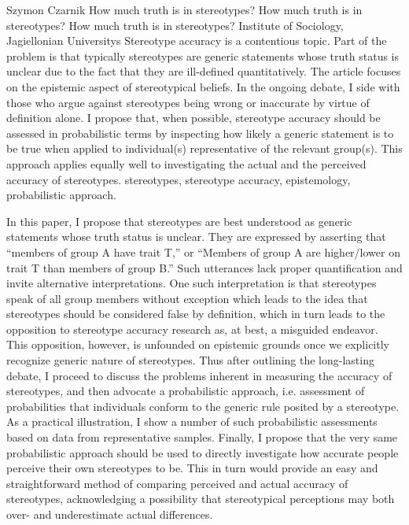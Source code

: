 \begin{artengenv}{Szymon Czarnik}
	{How much truth is in stereotypes?}
	{How much truth is in stereotypes?}
	{How much truth is in stereotypes?}
	{Institute of Sociology, Jagiellonian Universitys}
	{Stereotype accuracy is a contentious topic. Part of the problem is that typically stereotypes are generic statements whose truth status is unclear due to the fact that they are ill-defined quantitatively. The article focuses on the epistemic aspect of stereotypical beliefs. In the ongoing debate, I side with those who argue against stereotypes being wrong or inaccurate by virtue of definition alone. I propose that, when possible, stereotype accuracy should be assessed in probabilistic terms by inspecting how likely a generic statement is to be true when applied to individual(s) representative of the relevant group(s). This approach applies equally well to investigating the actual and the perceived accuracy of stereotypes.}
	{stereotypes, stereotype accuracy, epistemology, probabilistic approach.}

\vspace{2\baselineskip}
\lettrine[loversize=0.13,lines=2,lraise=-0.05,nindent=0em,findent=0.2pt]%
{I}{}n this paper, I propose that stereotypes are best understood as generic statements whose truth status is unclear. They are expressed by asserting that ``members of group A have trait T,'' or ``Members of group A are higher/lower on trait T than members of group B.'' Such utterances lack proper quantification and invite alternative interpretations. One such interpretation is that stereotypes speak of all group members without exception which leads to the idea that stereotypes should be considered false by definition, which in turn leads to the opposition to stereotype accuracy research as, at best, a misguided endeavor. This opposition, however, is unfounded on epistemic grounds once we explicitly recognize generic nature of stereotypes. Thus after outlining the long-lasting debate, I proceed to discuss the problems inherent in measuring the accuracy of stereotypes, and then advocate a probabilistic approach, i.e. assessment of probabilities that individuals conform to the generic rule posited by a stereotype. As a practical illustration, I show a number of such probabilistic assessments based on data from representative samples. Finally, I propose that the very same probabilistic approach should be used to directly investigate how accurate people perceive their own stereotypes to be. This in turn would provide an easy and straightforward method of comparing perceived and actual accuracy of stereotypes, acknowledging a possibility that stereotypical perceptions may both over- and underestimate actual differences.



\end{artengenv}
